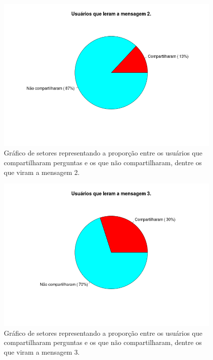     \begin{figure}[H]
        \center
        \includegraphics[scale=0.4]{./figuras/piechart-virammsg2-2.png}
        \caption{Gráfico de setores representando a proporção entre os usuários que compartilharam perguntas e os que não compartilharam, dentre os que viram a mensagem 2.}
        \label{fig:piechart2}
    \end{figure}
    
    \begin{figure}[H]
        \center
        \includegraphics[scale=0.4]{./figuras/piechart-virammsg3-2.png}
        \caption{Gráfico de setores representando a proporção entre os usuários que compartilharam perguntas e os que não compartilharam, dentre os que viram a mensagem 3.}
        \label{fig:piechart3}
    \end{figure}


